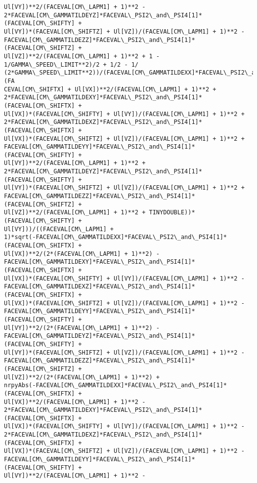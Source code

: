 \documentclass[landscape,letterpaper,10pt,english]{article}
\begin{document}
\begin{Verbatim}[commandchars=\\\{\}]
Ul[VY])**2/(FACEVAL[CM\_LAPM1] + 1)**2 -
2*FACEVAL[CM\_GAMMATILDEYZ]*FACEVAL\_PSI2\_and\_PSI4[1]*(FACEVAL[CM\_SHIFTY] +
Ul[VY])*(FACEVAL[CM\_SHIFTZ] + Ul[VZ])/(FACEVAL[CM\_LAPM1] + 1)**2 -
FACEVAL[CM\_GAMMATILDEZZ]*FACEVAL\_PSI2\_and\_PSI4[1]*(FACEVAL[CM\_SHIFTZ] +
Ul[VZ])**2/(FACEVAL[CM\_LAPM1] + 1)**2 + 1 - 1/GAMMA\_SPEED\_LIMIT**2)/2 + 1/2 - 1/
(2*GAMMA\_SPEED\_LIMIT**2))/(FACEVAL[CM\_GAMMATILDEXX]*FACEVAL\_PSI2\_and\_PSI4[1]*(FA
CEVAL[CM\_SHIFTX] + Ul[VX])**2/(FACEVAL[CM\_LAPM1] + 1)**2 +
2*FACEVAL[CM\_GAMMATILDEXY]*FACEVAL\_PSI2\_and\_PSI4[1]*(FACEVAL[CM\_SHIFTX] +
Ul[VX])*(FACEVAL[CM\_SHIFTY] + Ul[VY])/(FACEVAL[CM\_LAPM1] + 1)**2 +
2*FACEVAL[CM\_GAMMATILDEXZ]*FACEVAL\_PSI2\_and\_PSI4[1]*(FACEVAL[CM\_SHIFTX] +
Ul[VX])*(FACEVAL[CM\_SHIFTZ] + Ul[VZ])/(FACEVAL[CM\_LAPM1] + 1)**2 +
FACEVAL[CM\_GAMMATILDEYY]*FACEVAL\_PSI2\_and\_PSI4[1]*(FACEVAL[CM\_SHIFTY] +
Ul[VY])**2/(FACEVAL[CM\_LAPM1] + 1)**2 +
2*FACEVAL[CM\_GAMMATILDEYZ]*FACEVAL\_PSI2\_and\_PSI4[1]*(FACEVAL[CM\_SHIFTY] +
Ul[VY])*(FACEVAL[CM\_SHIFTZ] + Ul[VZ])/(FACEVAL[CM\_LAPM1] + 1)**2 +
FACEVAL[CM\_GAMMATILDEZZ]*FACEVAL\_PSI2\_and\_PSI4[1]*(FACEVAL[CM\_SHIFTZ] +
Ul[VZ])**2/(FACEVAL[CM\_LAPM1] + 1)**2 + TINYDOUBLE))*(FACEVAL[CM\_SHIFTY] +
Ul[VY]))/((FACEVAL[CM\_LAPM1] +
1)*sqrt(-FACEVAL[CM\_GAMMATILDEXX]*FACEVAL\_PSI2\_and\_PSI4[1]*(FACEVAL[CM\_SHIFTX] +
Ul[VX])**2/(2*(FACEVAL[CM\_LAPM1] + 1)**2) -
FACEVAL[CM\_GAMMATILDEXY]*FACEVAL\_PSI2\_and\_PSI4[1]*(FACEVAL[CM\_SHIFTX] +
Ul[VX])*(FACEVAL[CM\_SHIFTY] + Ul[VY])/(FACEVAL[CM\_LAPM1] + 1)**2 -
FACEVAL[CM\_GAMMATILDEXZ]*FACEVAL\_PSI2\_and\_PSI4[1]*(FACEVAL[CM\_SHIFTX] +
Ul[VX])*(FACEVAL[CM\_SHIFTZ] + Ul[VZ])/(FACEVAL[CM\_LAPM1] + 1)**2 -
FACEVAL[CM\_GAMMATILDEYY]*FACEVAL\_PSI2\_and\_PSI4[1]*(FACEVAL[CM\_SHIFTY] +
Ul[VY])**2/(2*(FACEVAL[CM\_LAPM1] + 1)**2) -
FACEVAL[CM\_GAMMATILDEYZ]*FACEVAL\_PSI2\_and\_PSI4[1]*(FACEVAL[CM\_SHIFTY] +
Ul[VY])*(FACEVAL[CM\_SHIFTZ] + Ul[VZ])/(FACEVAL[CM\_LAPM1] + 1)**2 -
FACEVAL[CM\_GAMMATILDEZZ]*FACEVAL\_PSI2\_and\_PSI4[1]*(FACEVAL[CM\_SHIFTZ] +
Ul[VZ])**2/(2*(FACEVAL[CM\_LAPM1] + 1)**2) +
nrpyAbs(-FACEVAL[CM\_GAMMATILDEXX]*FACEVAL\_PSI2\_and\_PSI4[1]*(FACEVAL[CM\_SHIFTX] +
Ul[VX])**2/(FACEVAL[CM\_LAPM1] + 1)**2 -
2*FACEVAL[CM\_GAMMATILDEXY]*FACEVAL\_PSI2\_and\_PSI4[1]*(FACEVAL[CM\_SHIFTX] +
Ul[VX])*(FACEVAL[CM\_SHIFTY] + Ul[VY])/(FACEVAL[CM\_LAPM1] + 1)**2 -
2*FACEVAL[CM\_GAMMATILDEXZ]*FACEVAL\_PSI2\_and\_PSI4[1]*(FACEVAL[CM\_SHIFTX] +
Ul[VX])*(FACEVAL[CM\_SHIFTZ] + Ul[VZ])/(FACEVAL[CM\_LAPM1] + 1)**2 -
FACEVAL[CM\_GAMMATILDEYY]*FACEVAL\_PSI2\_and\_PSI4[1]*(FACEVAL[CM\_SHIFTY] +
Ul[VY])**2/(FACEVAL[CM\_LAPM1] + 1)**2 -

\end{Verbatim}
\end{document}
